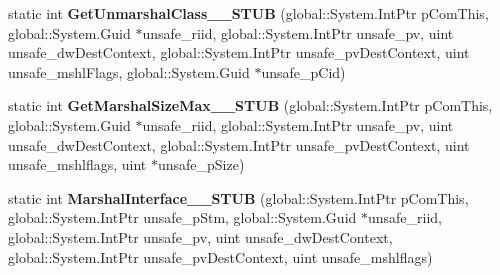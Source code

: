 \begin{DoxyCompactItemize}
\item 
\mbox{\label{struct_system_1_1_runtime_1_1_interop_services_1_1_i_marshal_____system___runtime___windows_runtime_____impl_1_1_vtbl_a952344c0b9708ed27abae95ba1e22bc8}} 
static int {\bfseries Get\+Unmarshal\+Class\+\_\+\+\_\+\+S\+T\+UB} (global\+::\+System.\+Int\+Ptr p\+Com\+This, global\+::\+System.\+Guid $\ast$unsafe\+\_\+riid, global\+::\+System.\+Int\+Ptr unsafe\+\_\+pv, uint unsafe\+\_\+dw\+Dest\+Context, global\+::\+System.\+Int\+Ptr unsafe\+\_\+pv\+Dest\+Context, uint unsafe\+\_\+mshl\+Flags, global\+::\+System.\+Guid $\ast$unsafe\+\_\+p\+Cid)
\item 
\mbox{\label{struct_system_1_1_runtime_1_1_interop_services_1_1_i_marshal_____system___runtime___windows_runtime_____impl_1_1_vtbl_ae262511ad2d922da2fa5f9b7b21f17fa}} 
static int {\bfseries Get\+Marshal\+Size\+Max\+\_\+\+\_\+\+S\+T\+UB} (global\+::\+System.\+Int\+Ptr p\+Com\+This, global\+::\+System.\+Guid $\ast$unsafe\+\_\+riid, global\+::\+System.\+Int\+Ptr unsafe\+\_\+pv, uint unsafe\+\_\+dw\+Dest\+Context, global\+::\+System.\+Int\+Ptr unsafe\+\_\+pv\+Dest\+Context, uint unsafe\+\_\+mshlflags, uint $\ast$unsafe\+\_\+p\+Size)
\item 
\mbox{\label{struct_system_1_1_runtime_1_1_interop_services_1_1_i_marshal_____system___runtime___windows_runtime_____impl_1_1_vtbl_a8ca757bdde9525e1da4e2ba60a35ffd6}} 
static int {\bfseries Marshal\+Interface\+\_\+\+\_\+\+S\+T\+UB} (global\+::\+System.\+Int\+Ptr p\+Com\+This, global\+::\+System.\+Int\+Ptr unsafe\+\_\+p\+Stm, global\+::\+System.\+Guid $\ast$unsafe\+\_\+riid, global\+::\+System.\+Int\+Ptr unsafe\+\_\+pv, uint unsafe\+\_\+dw\+Dest\+Context, global\+::\+System.\+Int\+Ptr unsafe\+\_\+pv\+Dest\+Context, uint unsafe\+\_\+mshlflags)
\item 
\mbox{\label{struct_system_1_1_runtime_1_1_interop_services_1_1_i_marshal_____system___runtime___windows_runtime_____impl_1_1_vtbl_a6325016e621765b68878de65e7fe333e}} 

\end{DoxyCompactItemize}
